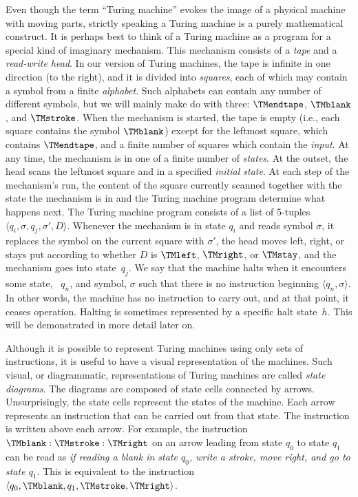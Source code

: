 \documentclass[../../include/open-logic-section]{subfiles}
\begin{document}
\begin{explain}
 Even though the term ``Turing machine'' evokes the image of
a physical machine with moving parts, strictly speaking a Turing machine is
a purely mathematical construct. It is perhaps best to think of a Turing
machine as a program for a special kind of imaginary mechanism. This
mechanism consists of a \emph{tape} and a \emph{read-write head}. In our
version of Turing machines, the tape is infinite in one direction (to the
right), and it is divided into \emph{squares}, each of which may contain a
symbol from a finite \emph{alphabet}. Such alphabets can contain any number
of different symbols, but we will mainly make do with three: $\TMendtape$,
$\TMblank$, and $\TMstroke$. When the mechanism is started, the tape is
empty (i.e., each square contains the symbol $\TMblank$) except for the
leftmost square, which contains $\TMendtape$, and a finite number of
squares which contain the \emph{input}. At any time, the mechanism is in
one of a finite number of \emph{states}. At the outset, the head scans the
leftmost square and in a specified \emph{initial state}. At each step of
the mechanism's run, the content of the square currently scanned together
with the state the mechanism is in and the Turing machine program determine
what happens next. The Turing machine program consists of a list of
5-tuples $\langle q_i, \sigma, q_j, \sigma', D\rangle$. Whenever the
mechanism is in state $q_i$ and reads symbol $\sigma$, it replaces the
symbol on the current square with $\sigma'$, the head moves left, right, or
stays put according to whether $D$ is $\TMleft$, $\TMright$, or $\TMstay$,
and the mechanism goes into state~$q_j$. We say that the machine halts when
it encounters some state, ~$q_n$, and symbol, $\sigma$ such that there is
no instruction beginning $\langle q_n, \sigma\rangle$. In other words, the
machine has no instruction to carry out, and at that point, it ceases
operation. Halting is sometimes represented by a specific halt state~$h$.
This will be demonstrated in more detail later on.

Although it is possible to represent Turing machines using only sets of 
instructions, it is useful to have a visual representation of the
machines. Such visual, or diagrammatic, representations of Turing
machines are called \emph{state diagrams}. The diagrams are composed of
state cells connected by arrows. Unsurprisingly, the state cells represent the
states of the machine. Each arrow represents an instruction that can be
carried out from that state. The instruction is written above each arrow.
For example, the instruction $\TMblank :\TMstroke :\TMright$ on an arrow
leading from state $q_0$ to state $q_1$ can be read as \emph{if reading a blank in
state $q_0$, write a stroke, move right, and go to state $q_1$}. This is
equivalent to the instruction $\tuple{q_0, \TMblank, q_1, \TMstroke, 
\TMright}$.


\end{explain}
\end{document}
